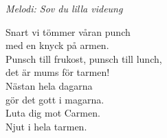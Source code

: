 {\footnotesize\textit{Melodi: Sov du lilla videung}}\par
\vspace{10pt}
Snart vi tömmer våran punch\\
med en knyck på armen.\\
Punsch till frukost, punsch till lunch,\\
det är mums för tarmen!\\
Nästan hela dagarna\\
gör det gott i magarna.\\
Luta dig mot Carmen.\\
Njut i hela tarmen.
